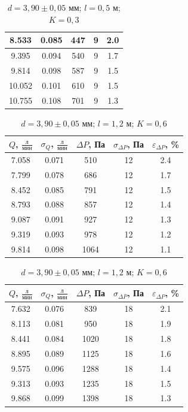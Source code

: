 \documentclass[a4paper,12pt]{article}
\begin{document}
\begin{table}[h!]
\begin{minipage}{0.48\textwidth}
\begin{tabular}{|c|c|c|c|c|}
        8.533 & 0.085 & 447 & 9 & 2.0 \\ \hline
        9.395 & 0.094 & 540 & 9 & 1.7 \\ \hline
        9.814 & 0.098 & 587 & 9 & 1.5 \\ \hline
        10.052 & 0.101 & 610 & 9 & 1.5 \\ \hline
        10.755 & 0.108 & 701 & 9 & 1.3 \\ \hline
    \end{tabular}
    \caption{$d = 3,90 \pm 0,05$ мм; $l = 0,5$ м; $K = 0,3$}
\end{minipage}
\end{table}

\begin{table}[h!]
\centering
\begin{minipage}{0.48\textwidth}
\centering
    \begin{tabular}{|c|c|c|c|c|}
        \hline
        $Q$, $\frac{\text{л}}{\text{мин}}$ & $\sigma_Q$, $\frac{\text{л}}{\text{мин}}$  & $\Delta P$, Па & $\sigma_{\Delta P}$, Па & $\varepsilon_{\Delta P}$, \% \\
        \hline
        7.058 & 0.071 & 510 & 12 & 2.4 \\ \hline
        7.799 & 0.078 & 686 & 12 & 1.7 \\ \hline
        8.452 & 0.085 & 791 & 12 & 1.5 \\ \hline
        8.793 & 0.088 & 857 & 12 & 1.4 \\ \hline
        9.087 & 0.091 & 927 & 12 & 1.3 \\ \hline
        9.319 & 0.093 & 978 & 12 & 1.2 \\ \hline
        9.814 & 0.098 & 1064 & 12 & 1.1 \\ \hline
    \end{tabular}
    \caption{$d = 3,90 \pm 0,05$ мм; $l = 0,9$ м; $K = 0,4$}
\end{minipage}
\hfill
\begin{minipage}{0.48\textwidth}
\centering
    \begin{tabular}{|c|c|c|c|c|}
        \hline
        $Q$, $\frac{\text{л}}{\text{мин}}$ & $\sigma_Q$, $\frac{\text{л}}{\text{мин}}$  & $\Delta P$, Па & $\sigma_{\Delta P}$, Па & $\varepsilon_{\Delta P}$, \% \\
        \hline
        7.632 & 0.076 & 839 & 18 & 2.1 \\ \hline
        8.113 & 0.081 & 950 & 18 & 1.9 \\ \hline
        8.441 & 0.084 & 1020 & 18 & 1.8 \\ \hline
        8.895 & 0.089 & 1125 & 18 & 1.6 \\ \hline
        9.575 & 0.096 & 1288 & 18 & 1.4 \\ \hline
        9.313 & 0.093 & 1235 & 18 & 1.5 \\ \hline
        9.868 & 0.099 & 1398 & 18 & 1.3 \\ \hline
    \end{tabular}
    \caption{$d = 3,90 \pm 0,05$ мм; $l = 1,2$ м; $K = 0,6$}
\end{minipage}
\end{table}
\end{document}
